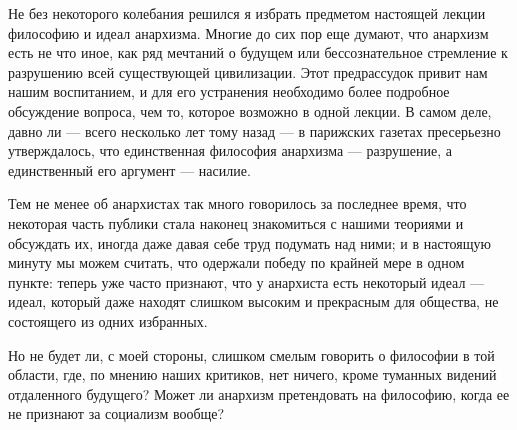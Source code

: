 Не без некоторого колебания решился я избрать предметом настоящей лекции философию и идеал анархизма. Многие до сих пор еще думают, что анархизм есть не что иное, как ряд мечтаний о будущем или бессознательное стремление к разрушению всей существующей цивилизации. Этот предрассудок привит нам нашим воспитанием, и для его устранения необходимо более подробное обсуждение вопроса, чем то, которое возможно в одной лекции. В самом деле, давно ли — всего несколько лет тому назад — в парижских газетах пресерьезно утверждалось, что единственная философия анархизма — разрушение, а единственный его аргумент — насилие.
\par
Тем не менее об анархистах так много говорилось за последнее время, что некоторая часть публики стала наконец знакомиться с нашими теориями и обсуждать их, иногда даже давая себе труд подумать над ними; и в настоящую минуту мы можем считать, что одержали победу по крайней мере в одном пункте: теперь уже часто признают, что у анархиста есть некоторый идеал — идеал, который даже находят слишком высоким и прекрасным для общества, не состоящего из одних избранных.
\par
Но не будет ли, с моей стороны, слишком смелым говорить о философии в той области, где, по мнению наших критиков, нет ничего, кроме туманных видений отдаленного будущего? Может ли анархизм претендовать на философию, когда ее не признают за социализм вообще?